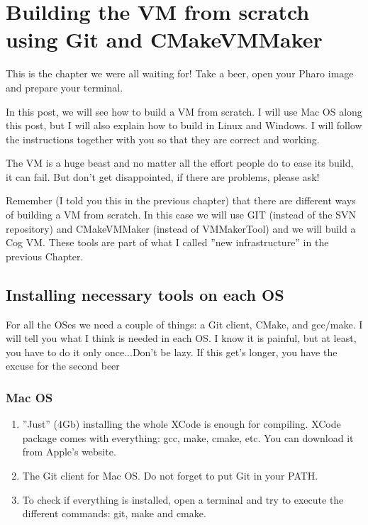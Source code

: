 \documentclass[a4paper,10pt,twoside]{book}
\begin{document}
\fi
\sloppy


\chapter{Building the VM from scratch using Git and CMakeVMMaker}

This is the chapter we were all waiting for! Take a beer, open your Pharo image and prepare your terminal. 

In this post, we will see how to build a VM from scratch. I will use Mac OS along this post, but I will also explain how to build in Linux and Windows. I will follow the instructions together with you so that they are correct and working. 

The VM is a huge beast and no matter all the effort people do to ease its build, it can fail. But don't get disappointed, if there are problems, please ask!

Remember (I told you this in the previous chapter) that there are different ways of building a VM  from scratch. In this case we will use GIT (instead of the SVN repository) and CMakeVMMaker (instead of VMMakerTool) and we will build a Cog VM. These tools are part of what I called ''new infrastructure'' in the previous Chapter.

\section{Installing necessary tools on each OS}

For all the OSes we need a couple of things: a Git client, CMake, and gcc/make. I will tell you what I think is needed in each OS. I know it is painful, but at least, you have to do it only once...Don't be lazy. If this get's longer, you have the excuse for the second beer 

\subsection{Mac OS}
\begin{enumerate}

\item ''Just'' (4Gb) installing the whole XCode is enough for compiling. XCode package comes with everything: gcc, make, cmake, etc. You can download it from Apple's website.

\item The Git client for Mac OS. Do not forget to put Git in your PATH.

\item To check if everything is installed, open a terminal and try to execute the different commands: git, make and cmake.
\end{enumerate}
\end{document}
